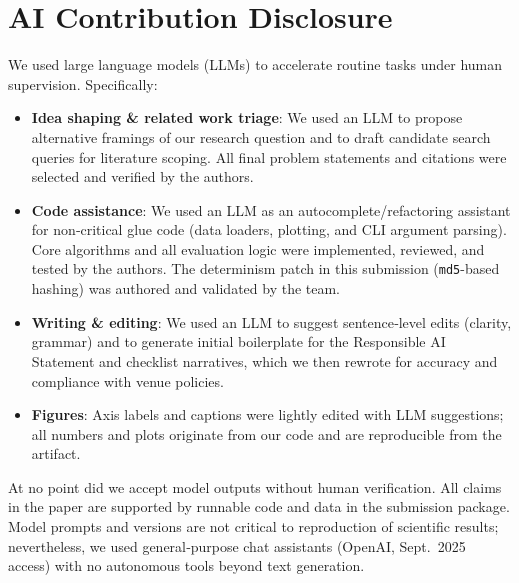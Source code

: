 \section*{AI Contribution Disclosure}

We used large language models (LLMs) to accelerate routine tasks under human supervision. Specifically:
\begin{itemize}
\item \textbf{Idea shaping \& related work triage}: We used an LLM to propose alternative framings of our research question and to draft candidate search queries for literature scoping. All final problem statements and citations were selected and verified by the authors.
\item \textbf{Code assistance}: We used an LLM as an autocomplete/refactoring assistant for non‑critical glue code (data loaders, plotting, and CLI argument parsing). Core algorithms and all evaluation logic were implemented, reviewed, and tested by the authors. The determinism patch in this submission (\texttt{md5}-based hashing) was authored and validated by the team.
\item \textbf{Writing \& editing}: We used an LLM to suggest sentence‑level edits (clarity, grammar) and to generate initial boilerplate for the Responsible AI Statement and checklist narratives, which we then rewrote for accuracy and compliance with venue policies.
\item \textbf{Figures}: Axis labels and captions were lightly edited with LLM suggestions; all numbers and plots originate from our code and are reproducible from the artifact.
\end{itemize}
At no point did we accept model outputs without human verification. All claims in the paper are supported by runnable code and data in the submission package. Model prompts and versions are not critical to reproduction of scientific results; nevertheless, we used general‑purpose chat assistants (OpenAI, Sept.\ 2025 access) with no autonomous tools beyond text generation.
